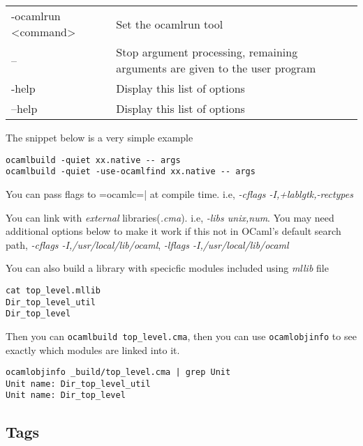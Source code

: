 \documentclass[11pt]{article}
\begin{document}
\begin{table}[htb]
\begin{center}
\begin{tabular}{ll}
 -ocamlrun <command>         &  Set the ocamlrun tool                                                         \\
 --                          &  Stop argument processing, remaining arguments are given to the user program   \\
 -help                       &  Display this list of options                                                  \\
 --help                      &  Display this list of options                                                  \\
\end{tabular}
\end{center}
\end{table}



   The snippet below is a very simple example

\begin{verbatim}
ocamlbuild -quiet xx.native -- args
ocamlbuild -quiet -use-ocamlfind xx.native -- args
\end{verbatim}

   You can pass flags to =ocamlc=| at compile time. i.e, \emph{-cflags    -I,+lablgtk,-rectypes}

   You can link with \emph{external} libraries(\emph{.cma}). i.e, \emph{-libs    unix,num}.  You may need additional options below to make it work
   if this not in OCaml's default search path, \emph{-cflags    -I,/usr/local/lib/ocaml}, \emph{-lflags -I,/usr/local/lib/ocaml}


   You can also build a library with specicfic modules included using
   \emph{mllib} file


\begin{verbatim}
cat top_level.mllib    
Dir_top_level_util
Dir_top_level
\end{verbatim}
   
   Then you can \texttt{ocamlbuild top\_level.cma}, then you can use
   \texttt{ocamlobjinfo} to see exactly which modules are linked into it.


\begin{verbatim}
ocamlobjinfo _build/top_level.cma | grep Unit  
Unit name: Dir_top_level_util
Unit name: Dir_top_level
\end{verbatim}
\subsection*{Tags}
\label{sec-1-2}
\end{document}
